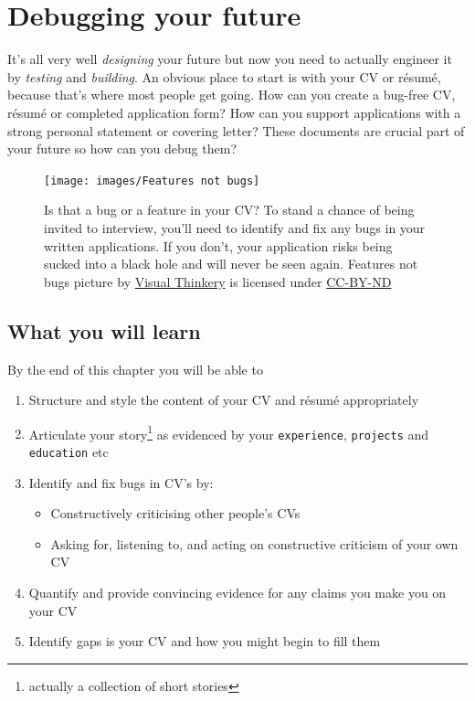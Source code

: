 \documentclass[
]{book}
\providecommand{\tightlist}{%
  \setlength{\itemsep}{0pt}\setlength{\parskip}{0pt}}
\begin{document}
\hypertarget{debugging}{%
\chapter{Debugging your future}\label{debugging}}

It's all very well \emph{designing} your future but now you need to actually engineer it by \emph{testing} and \emph{building}. An obvious place to start is with your CV or résumé, because that's where most people get going. How can you create a bug-free CV, résumé or completed application form? How can you support applications with a strong personal statement or covering letter? These documents are crucial part of your future so how can you debug them? 🐛

\begin{figure}

{\centering \texttt{[image: images/Features not bugs]} 

}

\caption{Is that a bug or a feature in your CV? To stand a chance of being invited to interview, you'll need to identify and fix any bugs in your written applications. If you don't, your application risks being sucked into a black hole and will never be seen again. Features not bugs picture by \href{https://visualthinkery.com}{Visual Thinkery} is licensed under \href{https://creativecommons.org/licenses/by-nd/4.0/}{CC-BY-ND}}\label{fig:bugfeature-fig}
\end{figure}



\hypertarget{ilo7}{%
\section{What you will learn}\label{ilo7}}

By the end of this chapter you will be able to

\begin{enumerate}
\def\labelenumi{\arabic{enumi}.}
\tightlist
\item
  Structure and style the content of your CV and résumé appropriately
\item
  Articulate your story\footnote{actually a collection of short stories} as evidenced by your \texttt{experience}, \texttt{projects} and \texttt{education} etc
\item
  Identify and fix bugs in CV's by:

  \begin{itemize}
  \tightlist
  \item
    Constructively criticising other people's CVs
  \item
    Asking for, listening to, and acting on constructive criticism of your own CV
  \end{itemize}
\item
  Quantify and provide convincing evidence for any claims you make you on your CV
\item
  Identify gaps is your CV and how you might begin to fill them
\end{enumerate}
\end{document}
